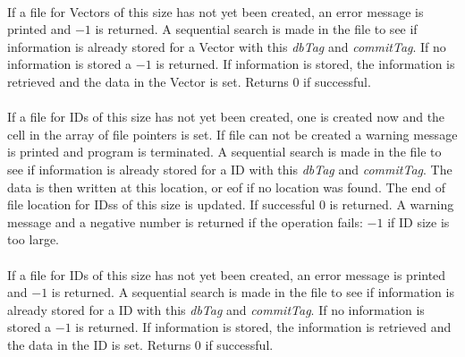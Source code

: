 \\
If a file for Vectors of this size has not yet been created, an error message
is printed and $-1$ is returned.  A sequential search
is made in the file to see if information is already stored for a Vector with
this {\em dbTag} and {\em commitTag}. If no information is stored a
$-1$ is returned. If information is stored, the information is
retrieved and the data in the Vector is set. Returns $0$ if
successful. \\

\\
If a file
for IDs of this size has not yet been created, one is created now
and the cell in the array of file pointers is set. If file can not be
created a warning message is printed and program is terminated. A sequential search
is made in the file to see if information is already stored for a ID with
this {\em dbTag} and {\em commitTag}. The data is then written at this
location, or eof if no location was found. The end of file location
for IDss of this size is updated. If successful $0$ is
returned. A warning message and a negative number is returned if the
operation fails: $-1$ if ID size is too large. \\

\\
If a file for IDs of this size has not yet been created, an error message
is printed and $-1$ is returned.  A sequential search
is made in the file to see if information is already stored for a ID with
this {\em dbTag} and {\em commitTag}. If no information is stored a
$-1$ is returned. If information is stored, the information is
retrieved and the data in the ID is set. Returns $0$ if successful. 
